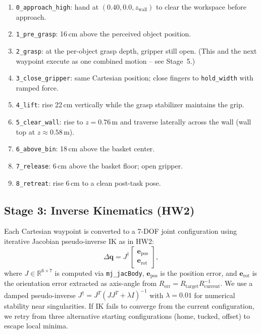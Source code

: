 \documentclass[11pt]{article}
\begin{document}
\begin{enumerate}[nosep, leftmargin=*]
\item \texttt{0\_approach\_high}: hand at $(0.40, 0.0, z_{\text{wall}})$
to clear the workspace before approach.
\item \texttt{1\_pre\_grasp}: 16\,cm above the perceived object position.
\item \texttt{2\_grasp}: at the per-object grasp depth, gripper still
open. (This and the next waypoint execute as one combined motion -- see
Stage~5.)
\item \texttt{3\_close\_gripper}: same Cartesian position; close fingers
to \texttt{hold\_width} with ramped force.
\item \texttt{4\_lift}: rise 22\,cm vertically while the grasp stabilizer
maintains the grip.
\item \texttt{5\_clear\_wall}: rise to $z = 0.76$\,m and traverse
laterally across the wall (wall top at $z \approx 0.58$\,m).
\item \texttt{6\_above\_bin}: 18\,cm above the basket center.
\item \texttt{7\_release}: 6\,cm above the basket floor; open gripper.
\item \texttt{8\_retreat}: rise 6\,cm to a clean post-task pose.
\end{enumerate}

\subsection{Stage 3: Inverse Kinematics (HW2)}

Each Cartesian waypoint is converted to a 7-DOF joint configuration
using iterative Jacobian pseudo-inverse IK as in HW2:
\[
\Delta \mathbf{q} = J^{\dagger} \begin{bmatrix} \mathbf{e}_{\text{pos}} \\
\mathbf{e}_{\text{rot}} \end{bmatrix},
\]
where $J \in \mathbb{R}^{6 \times 7}$ is computed via \texttt{mj\_jacBody},
$\mathbf{e}_{\text{pos}}$ is the position error, and
$\mathbf{e}_{\text{rot}}$ is the orientation error extracted as axis-angle
from $R_{\text{err}} = R_{\text{target}} R_{\text{current}}^{-1}$. We use
a damped pseudo-inverse $J^{\dagger} = J^T (J J^T + \lambda I)^{-1}$ with
$\lambda = 0.01$ for numerical stability near singularities. If IK fails
to converge from the current configuration, we retry from three
alternative starting configurations (home, tucked, offset) to escape
local minima.
\end{document}
